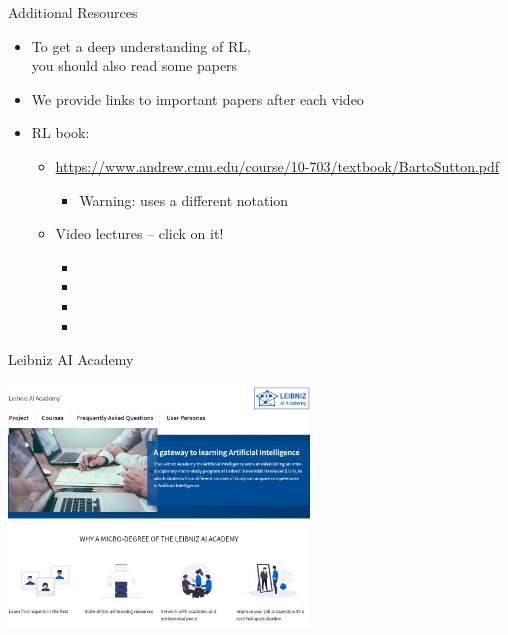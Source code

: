 \documentclass[aspectratio=169, handout]{../latex_main/tntbeamer}  %
\begin{document}
\begin{frame}[c]{Additional Resources}

\begin{itemize}
  \item To get a deep understanding of RL,\\ you should also read some papers 
  \item We provide links to important papers after each video
  \item RL book: 
  \begin{itemize}
      \item \url{https://www.andrew.cmu.edu/course/10-703/textbook/BartoSutton.pdf}
      \begin{itemize}
          \item Warning: uses a different notation
      \end{itemize}
    \item Video lectures -- click on it!
    \begin{itemize}
        \item {}
        \item {}
        \item {}
        \item {}
    \end{itemize}
  \end{itemize}
\end{itemize}

\end{frame}
\begin{frame}{Leibniz AI Academy}
    
    \centering
    \vspace{-2em}
    \includegraphics[width=0.6\textwidth]{images/laa.png}

\end{frame}
\end{document}
